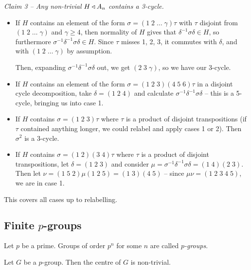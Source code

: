 \documentclass{../../template/note}
\begin{document}

    \emph{Claim 3 -- Any non-trivial $H \triangleleft A_n$ contains a 3-cycle.}

    \begin{itemize}
        \item If $H$ contains an element of the form $\sigma = (1 \; 2 \; \dots \; \gamma)\tau$ with $\tau$ disjoint from $(1 \; 2 \; \dots \; \gamma)$ and $\gamma \geq 4$, then normality of $H$ gives that $\delta^{-1}\sigma\delta \in H$, so furthermore $\sigma^{-1}\delta^{-1}\sigma\delta \in H$. Since $\tau$ misses 1, 2, 3, it commutes with $\delta$, and with $(1 \; 2 \; \dots \; \gamma)$ by assumption.

        Then, expanding $\sigma^{-1}\delta^{-1}\sigma\delta$ out, we get $(2 \; 3 \; \gamma)$, so we have our 3-cycle.

        \item If $H$ contains an element of the form $\sigma = (1 \; 2 \; 3)(4 \; 5 \; 6)\tau$ in a disjoint cycle decomposition, take $\delta = (1 \; 2 \; 4)$ and calculate $\sigma^{-1}\delta^{-1}\sigma\delta$ -- this is a 5-cycle, bringing us into case 1.
        
        \item If $H$ contains $\sigma = (1 \; 2 \; 3)\tau$ where $\tau$ is a product of disjoint transpositions (if $\tau$ contained anything longer, we could relabel and apply cases 1 or 2). Then $\sigma^2$ is a 3-cycle.
        
        \item If $H$ contains $\sigma = (1 \; 2)(3 \; 4)\tau$ where $\tau$ is a product of disjoint transpositions, let $\delta = (1 \; 2 \; 3)$ and consider $\mu = \sigma^{-1}\delta^{-1}\sigma\delta = (1 \; 4)(2 \; 3)$. Then let $\nu = (1 \; 5 \; 2)\mu (1 \; 2 \; 5) = (1 \; 3)(4 \; 5)$ -- since $\mu\nu = (1 \; 2 \; 3 \; 4 \; 5)$, we are in case 1.
    \end{itemize}
    This covers all cases up to relabelling.
    
    \subsection{Finite $p$-groups}

    Let $p$ be a prime. Groups of order $p^n$ for some $n$ are called \emph{$p$-groups}.

    \begin{theorem}
        Let $G$ be a $p$-group. Then the centre of $G$ is non-trivial.
        \label{centre-nontrivial}
    \end{theorem}
    
\end{document}
